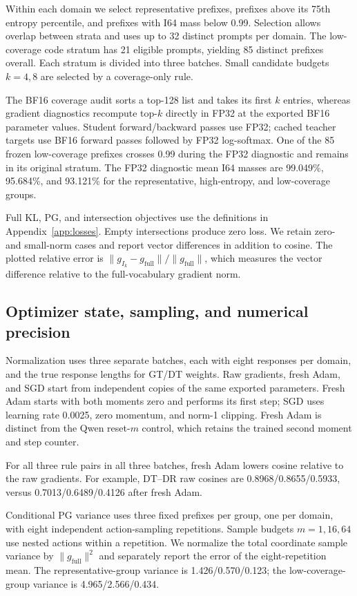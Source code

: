 Within each domain we select representative prefixes, prefixes above its 75th entropy percentile, and prefixes with I64 mass below 0.99. Selection allows overlap between strata and uses up to 32 distinct prompts per domain. The low-coverage code stratum has 21 eligible prompts, yielding 85 distinct prefixes overall. Each stratum is divided into three batches. Small candidate budgets $k=4,8$ are selected by a coverage-only rule.

The BF16 coverage audit sorts a top-128 list and takes its first $k$ entries, whereas gradient diagnostics recompute top-$k$ directly in FP32 at the exported BF16 parameter values. Student forward/backward passes use FP32; cached teacher targets use BF16 forward passes followed by FP32 log-softmax. One of the 85 frozen low-coverage prefixes crosses 0.99 during the FP32 diagnostic and remains in its original stratum. The FP32 diagnostic mean I64 masses are 99.049\%, 95.684\%, and 93.121\% for the representative, high-entropy, and low-coverage groups.

Full KL, PG, and intersection objectives use the definitions in Appendix~\ref{app:losses}. Empty intersections produce zero loss. We retain zero- and small-norm cases and report vector differences in addition to cosine. The plotted relative error is $\|g_{I_k}-g_{\mathrm{full}}\|/\|g_{\mathrm{full}}\|$, which measures the vector difference relative to the full-vocabulary gradient norm.

\subsection{Optimizer state, sampling, and numerical precision}
\label{app:smollm_controls}

Normalization uses three separate batches, each with eight responses per domain, and the true response lengths for GT/DT weights. Raw gradients, fresh Adam, and SGD start from independent copies of the same exported parameters. Fresh Adam starts with both moments zero and performs its first step; SGD uses learning rate 0.0025, zero momentum, and norm-1 clipping. Fresh Adam is distinct from the Qwen reset-$m$ control, which retains the trained second moment and step counter.

For all three rule pairs in all three batches, fresh Adam lowers cosine relative to the raw gradients. For example, DT--DR raw cosines are 0.8968/0.8655/0.5933, versus 0.7013/0.6489/0.4126 after fresh Adam.

Conditional PG variance uses three fixed prefixes per group, one per domain, with eight independent action-sampling repetitions. Sample budgets $m=1,16,64$ use nested actions within a repetition. We normalize the total coordinate sample variance by $\|g_{\mathrm{full}}\|^2$ and separately report the error of the eight-repetition mean. The representative-group variance is 1.426/0.570/0.123; the low-coverage-group variance is 4.965/2.566/0.434.

